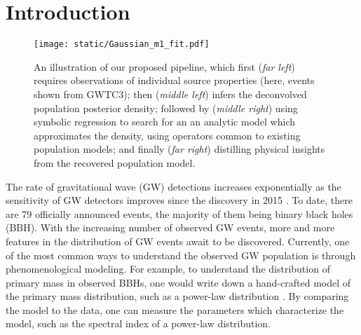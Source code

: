 \documentclass[nohyperref]{article}
\theoremstyle{plain}
\theoremstyle{definition}
\theoremstyle{remark}
\begin{document}
\section{Introduction}
\begin{figure*}[hbt!]
\texttt{[image: static/Gaussian\_m1\_fit.pdf]}
\caption{An illustration of our proposed pipeline, which first
(\textit{far left})
requires observations of individual source properties (here, events shown from GWTC3);
then
(\textit{middle left}) 
infers the deconvolved population posterior density;
followed by (\textit{middle right})
using symbolic regression to search for an
an analytic model which approximates the density, using
operators common to existing population models; and finally
(\textit{far right}) distilling physical insights
from the recovered population model.
}
\label{fig:Gaussian_m1_fit}
\end{figure*}
The rate of gravitational wave (GW) detections increases exponentially as the sensitivity of GW detectors improves \cite{LIGOScientific:2021djp} since the discovery in 2015 \cite{Abbott:2016blz}.
To date, there are 79 officially announced events, the majority of them being binary black holes (BBH).
With the increasing number of observed GW events, more and more features in the distribution of GW events await to be discovered.
Currently, one of the most common ways to understand the observed GW population is through phenomenological modeling.
For example, to understand the distribution of primary mass in observed BBHs, one would write down a hand-crafted model of the primary mass distribution, such as a power-law distribution \cite{LIGOScientific:2021psn}.
By comparing the model to the data, one can measure the parameters which characterize the model, such as the spectral index of a power-law distribution.
\end{document}

